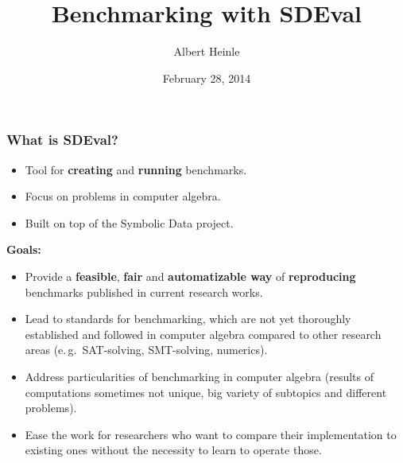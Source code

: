 \documentclass{beamer}
\author{Albert Heinle}
\institute{U Waterloo}
\title{Benchmarking with SDEval}
\date{February 28, 2014}
\begin{document}
\begin{frame}
\begin{titlepage}
\end{titlepage}
\end{frame}
\begin{frame}
  \frametitle{What is SDEval?}
  
  \begin{itemize}
    \item Tool for {\textbf{creating}} and {\textbf{running}} benchmarks.
    \item Focus on problems in computer algebra.
    \item Built on top of the Symbolic Data project.
  \end{itemize}
  {\textbf{Goals:}}
  \begin{itemize}
    \item Provide a {\textbf{feasible}}, {\textbf{fair}} and
      {\textbf{automatizable way}} of {\textbf{reproducing}} benchmarks
      published in current research works.
    \item Lead to standards for benchmarking, which are not yet thoroughly
      established and followed in computer algebra compared to other research
      areas (e.\,g.\ SAT-solving, SMT-solving, numerics).
    \item Address particularities of benchmarking in computer algebra (results
      of computations sometimes not unique, big variety of subtopics and
      different problems).
    \item Ease the work for researchers who want to compare their
      implementation to existing ones without the necessity to learn to
      operate those.
  \end{itemize}
\end{frame}
\end{document}
